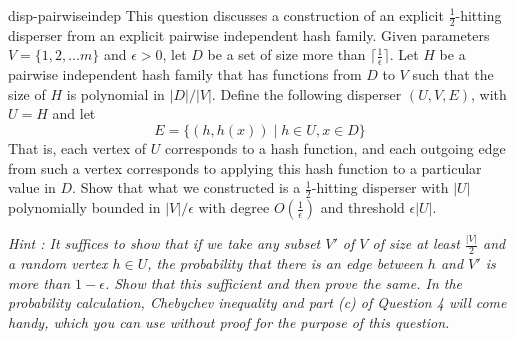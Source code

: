 \begin{exercise-prob}
\begin{show-ps4}{disp-pairwiseindep}
This question discusses a construction of an explicit $\frac{1}{2}$-hitting disperser from an explicit pairwise independent hash family. Given parameters $V = \{1,2,\ldots m\}$ and $\epsilon > 0$, let $D$ be a set of size more than $\lceil \frac{1}{\epsilon} \rceil$. Let $H$ be a pairwise independent hash family that has functions from $D$ to $V$ such that the size of $H$ is polynomial in $|D|/|V|$. Define the following disperser $(U,V,E)$, with $U = H$ and let $$E = \{(h,h(x)) \mid h \in U, x \in D\}$$ That is, each vertex of $U$ corresponds to a hash function, and each outgoing edge from such a vertex corresponds to applying this hash function to a particular value in $D$. Show that what we constructed is a $\frac{1}{2}$-hitting disperser with $|U|$ polynomially bounded in $|V|/\epsilon$ with degree $O(\frac{1}{\epsilon})$ and threshold $\epsilon |U|$.

{\em Hint : It suffices to show that if we take any subset $V'$ of $V$ of size at least $\frac{|V|}{2}$ and a random vertex $h \in U$, the probability that there is an edge between $h$ and $V'$ is more than $1-\epsilon$. Show that this sufficient and then prove the same. In the probability calculation, Chebychev inequality and part (c) of Question 4 will come handy, which you can use without proof for the purpose of this question.}
\end{show-ps4}
\end{exercise-prob}
